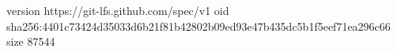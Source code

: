 version https://git-lfs.github.com/spec/v1
oid sha256:4401c73424d35033d6b21f81b42802b09ed93e47b435dc5b1f5eef71ea296c66
size 87544
